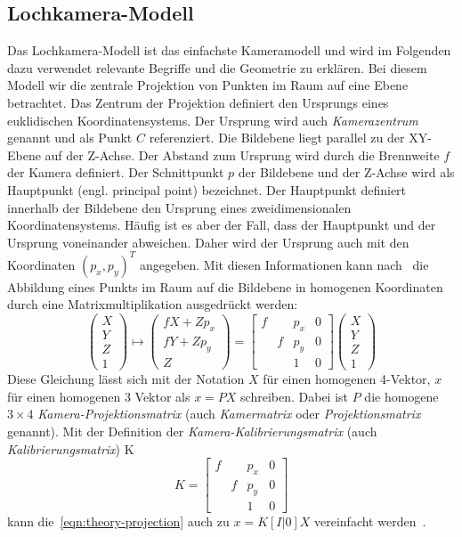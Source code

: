 \subsection{Lochkamera-Modell}
Das Lochkamera-Modell ist das einfachste Kameramodell und wird im Folgenden dazu verwendet relevante Begriffe und die Geometrie zu erklären.
Bei diesem Modell wir die zentrale Projektion von Punkten im Raum auf eine Ebene betrachtet.
Das Zentrum der Projektion definiert den Ursprungs eines euklidischen Koordinatensystems.
Der Ursprung wird auch \emph{Kamerazentrum} genannt und als Punkt $C$ referenziert.
Die Bildebene liegt parallel zu der XY-Ebene auf der Z-Achse.
Der Abstand zum Ursprung wird durch die Brennweite $f$ der Kamera definiert.
Der Schnittpunkt $p$ der Bildebene und der Z-Achse wird als Hauptpunkt (engl. principal point) bezeichnet.
Der Hauptpunkt definiert innerhalb der Bildebene den Ursprung eines zweidimensionalen Koordinatensystems.
Häufig ist es aber der Fall, dass der Hauptpunkt und der Ursprung voneinander abweichen.
Daher wird der Ursprung auch mit den Koordinaten $(p_x, p_y)^T$ angegeben.
Mit diesen Informationen kann nach~\cite[Gleichung 6.2]{hartley_2003} die Abbildung eines Punkts im Raum auf die Bildebene in homogenen Koordinaten durch eine Matrixmultiplikation ausgedrückt werden:
\begin{equation}
\label{eqn:theory-projection}
\begin{pmatrix}
    X \\ Y \\ Z \\ 1
\end{pmatrix}
\mapsto
\begin{pmatrix}
    fX+Zp_x \\ fY+Zp_y \\ Z
\end{pmatrix}
=
\begin{bmatrix}
    f &   & p_x & 0 \\
      & f & p_y & 0 \\
      &   & 1   & 0
\end{bmatrix}
\begin{pmatrix}
    X \\ Y \\ Z \\ 1
\end{pmatrix}
\end{equation}
Diese Gleichung lässt sich mit der Notation $X$ für einen homogenen 4-Vektor, $x$ für einen homogenen 3 Vektor als $x = PX$ schreiben.
Dabei ist $P$ die homogene $3\times 4$ \emph{Kamera-Projektionsmatrix} (auch \emph{Kamermatrix} oder \emph{Projektionsmatrix} genannt).
Mit der Definition der \emph{Kamera-Kalibrierungsmatrix} (auch \emph{Kalibrierungsmatrix}) K
\[
    K=
    \begin{bmatrix}
    f &   & p_x & 0 \\
      & f & p_y & 0 \\
      &   & 1   & 0
    \end{bmatrix}
\]
kann die~\ref{eqn:theory-projection} auch zu $x=K[I | 0] X$ vereinfacht werden~\cite[vgl. Gleichung 6.5]{hartley_2003}. 


